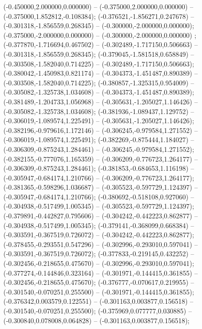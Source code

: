  (-0.450000,2.000000,0.000000) -- (-0.375000,2.000000,0.000000) -- (-0.375000,1.852812,-0.108384);
 (-0.376521,-1.856271,0.247678) -- (-0.301318,-1.856559,0.268345) -- (-0.300000,-2.000000,0.000000);
 (-0.375000,-2.000000,0.000000) -- (-0.300000,-2.000000,0.000000) ;
 (-0.377870,-1.716694,0.467502) -- (-0.302489,-1.717150,0.506663) -- (-0.301318,-1.856559,0.268345);
 (-0.379045,-1.581518,0.658849) -- (-0.303508,-1.582040,0.714225) -- (-0.302489,-1.717150,0.506663);
 (-0.380042,-1.450983,0.821174) -- (-0.304373,-1.451487,0.890389) -- (-0.303508,-1.582040,0.714225);
 (-0.380857,-1.325315,0.954009) -- (-0.305082,-1.325738,1.034608) -- (-0.304373,-1.451487,0.890389);
 (-0.381489,-1.204733,1.056968) -- (-0.305631,-1.205027,1.146426) -- (-0.305082,-1.325738,1.034608);
 (-0.381936,-1.089437,1.129752) -- (-0.306019,-1.089574,1.225491) -- (-0.305631,-1.205027,1.146426);
 (-0.382196,-0.979616,1.172146) -- (-0.306245,-0.979584,1.271552) -- (-0.306019,-1.089574,1.225491);
 (-0.382269,-0.875444,1.184027) -- (-0.306309,-0.875243,1.284461) -- (-0.306245,-0.979584,1.271552);
 (-0.382155,-0.777076,1.165359) -- (-0.306209,-0.776723,1.264177) -- (-0.306309,-0.875243,1.284461);
 (-0.381853,-0.684653,1.116198) -- (-0.305947,-0.684174,1.210766) -- (-0.306209,-0.776723,1.264177);
 (-0.381365,-0.598296,1.036687) -- (-0.305523,-0.597729,1.124397) -- (-0.305947,-0.684174,1.210766);
 (-0.380692,-0.518108,0.927060) -- (-0.304938,-0.517499,1.005345) -- (-0.305523,-0.597729,1.124397);
 (-0.379891,-0.442827,0.795606) -- (-0.304242,-0.442223,0.862877) -- (-0.304938,-0.517499,1.005345);
 (-0.379141,-0.368099,0.668384) -- (-0.303591,-0.367519,0.726072) -- (-0.304242,-0.442223,0.862877);
 (-0.378455,-0.293551,0.547296) -- (-0.302996,-0.293010,0.597041) -- (-0.303591,-0.367519,0.726072);
 (-0.377833,-0.219145,0.432252) -- (-0.302456,-0.218655,0.475670) -- (-0.302996,-0.293010,0.597041);
 (-0.377274,-0.144846,0.323164) -- (-0.301971,-0.144415,0.361855) -- (-0.302456,-0.218655,0.475670);
 (-0.376777,-0.070617,0.219955) -- (-0.301540,-0.070251,0.255500) -- (-0.301971,-0.144415,0.361855);
 (-0.376342,0.003579,0.122551) -- (-0.301163,0.003877,0.156518) -- (-0.301540,-0.070251,0.255500);
 (-0.375969,0.077777,0.030885) -- (-0.300840,0.078008,0.064828) -- (-0.301163,0.003877,0.156518);
